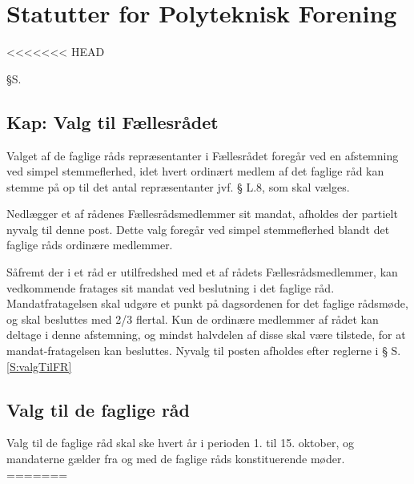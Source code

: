 \setcounter{section}{19}
\setcounter{subsection}{0}
\section*{Statutter for Polyteknisk Forening}
<<<<<<< HEAD


\begin{list}
{\S S.}{}

\subsection{Kap: Valg til Fællesrådet}
\label{kap:valgtilfaellesraad}

\item \label{S:valgTilFR} Valget af de faglige råds repræsentanter i Fællesrådet foregår ved en afstemning ved simpel stemmeflerhed, idet hvert ordinært medlem af det faglige råd kan stemme på op til det antal repræsentanter jvf. § L.8, som skal vælges.

\item \label{S:nyValgTilFR} Nedlægger et af rådenes Fællesrådsmedlemmer sit mandat, afholdes der partielt nyvalg til denne post. Dette valg foregår ved simpel stemmeflerhed blandt det faglige råds ordinære medlemmer.

\item \label{S:fratagsValgTilFR} Såfremt der i et råd er utilfredshed med et af rådets Fællesrådsmedlemmer, kan vedkommende fratages sit mandat ved beslutning i det faglige råd. Mandatfratagelsen skal udgøre et punkt på dagsordenen for det faglige rådsmøde, og skal besluttes med 2/3 flertal. Kun de ordinære medlemmer af rådet kan deltage i denne afstemning, og mindst halvdelen af disse skal være tilstede, for at mandat-fratagelsen kan besluttes. Nyvalg til posten afholdes efter reglerne i § S.\ref{S:valgTilFR}



\subsection{Valg til de faglige råd}

\item Valg til de faglige råd skal ske hvert år i perioden 1. til 15. oktober, og mandaterne gælder fra og med de faglige råds konstituerende møder.\\
=======


\end{list}
